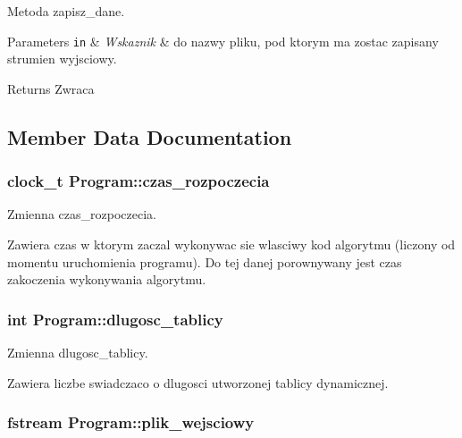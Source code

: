 Metoda zapisz\-\_\-dane. 


\begin{DoxyParams}[1]{Parameters}
\mbox{\tt in}  & {\em Wskaznik} & do nazwy pliku, pod ktorym ma zostac zapisany strumien wyjsciowy. \\
\hline
\end{DoxyParams}
\begin{DoxyReturn}{Returns}
Zwraca 
\end{DoxyReturn}


\subsection{Member Data Documentation}
\hypertarget{class_program_a8cdcc795adc329732f41b399044d0a5b}{
\subsubsection[{czas\-\_\-rozpoczecia}]{\setlength{\rightskip}{0pt plus 5cm}clock\-\_\-t Program\-::czas\-\_\-rozpoczecia}}\label{class_program_a8cdcc795adc329732f41b399044d0a5b}


Zmienna czas\-\_\-rozpoczecia. 

Zawiera czas w ktorym zaczal wykonywac sie wlasciwy kod algorytmu (liczony od momentu uruchomienia programu). Do tej danej porownywany jest czas zakoczenia wykonywania algorytmu. \hypertarget{class_program_a7edd77bb13eb767fcbcabd5f2a4ae468}{
\subsubsection[{dlugosc\-\_\-tablicy}]{\setlength{\rightskip}{0pt plus 5cm}int Program\-::dlugosc\-\_\-tablicy}}\label{class_program_a7edd77bb13eb767fcbcabd5f2a4ae468}


Zmienna dlugosc\-\_\-tablicy. 

Zawiera liczbe swiadczaco o dlugosci utworzonej tablicy dynamicznej. \hypertarget{class_program_a532ceacb1d70da66142bab96a3eb0753}{
\subsubsection[{plik\-\_\-wejsciowy}]{\setlength{\rightskip}{0pt plus 5cm}fstream Program\-::plik\-\_\-wejsciowy}}\label{class_program_a532ceacb1d70da66142bab96a3eb0753}


